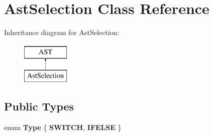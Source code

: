 \hypertarget{classAstSelection}{\section{Ast\-Selection Class Reference}
\label{classAstSelection}
}
Inheritance diagram for Ast\-Selection\-:\begin{figure}[H]
\begin{center}
\leavevmode
\includegraphics[height=2.000000cm]{classAstSelection}
\end{center}
\end{figure}
\subsection*{Public Types}
\begin{DoxyCompactItemize}
\item 
enum {\bfseries Type} \{ {\bfseries S\-W\-I\-T\-C\-H}, 
{\bfseries I\-F\-E\-L\-S\-E}
 \}
\end{DoxyCompactItemize}
